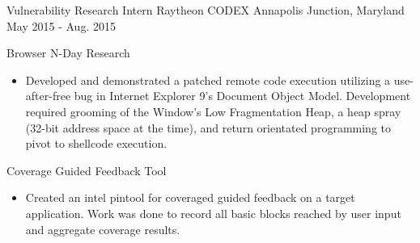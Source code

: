 \begin{cventries}
  \cventry
    {Vulnerability Research Intern} %
    {Raytheon CODEX} %
    {Annapolis Junction, Maryland} %
    {May 2015 - Aug. 2015} %
    {
      \begin{cvitems} %
        \item {Browser N-Day Research}
        \begin{itemize}
          \item {Developed and demonstrated a patched remote code execution utilizing a use-after-free bug in Internet Explorer 9's Document Object Model. Development required grooming of the Window's Low Fragmentation Heap, a heap spray (32-bit address space at the time), and return orientated programming to pivot to shellcode execution.}
        \end{itemize}
        \item {Coverage Guided Feedback Tool}
        \begin{itemize}
          \item {Created an intel pintool for coveraged guided feedback on a target application. Work was done to record all basic blocks reached by user input and aggregate coverage results.}
        \end{itemize}
      \end{cvitems}
    }

\end{cventries}
